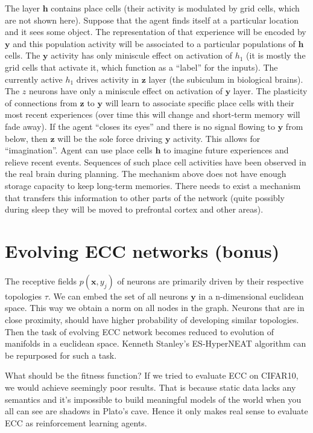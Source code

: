 \documentclass[12pt]{article}
\begin{document}
The layer $\boldsymbol{h}$ contains place cells (their activity is modulated by grid cells, which are not shown here). Suppose that the agent finds itself at a particular location and it sees some object. The representation of that experience will be encoded by $\boldsymbol{y}$ and this population activity will be associated to a particular populations of $\boldsymbol{h}$ cells. The $\boldsymbol{y}$  activity has only miniscule effect on activation of $h_1$ (it is mostly the grid cells that activate it, which function as a ``label'' for the inputs). The currently active $h_1$ drives activity in $\boldsymbol{z}$ layer (the subiculum in biological brains). The $z$ neurons have only a miniscule effect on activation of $\boldsymbol{y}$ layer. The plasticity of connections from $\boldsymbol{z}$ to $\boldsymbol{y}$ will learn to associate specific place cells with their most recent experiences (over time this will change and short-term memory will fade away). If the agent ``closes its eyes'' and there is no signal flowing to $\boldsymbol{y}$ from below, then $\boldsymbol{z}$ will be the sole force driving $\boldsymbol{y}$ activity. This allows for ``imagination''. Agent can use place cells $\boldsymbol{h}$ to imagine future experiences and relieve recent events. Sequences of such place cell activities have been observed in the real brain during planning. The mechanism above does not have enough storage capacity to keep long-term memories. There needs to exist a mechanism that transfers this information to other parts of the network (quite possibly during sleep they will be moved to prefrontal cortex and other areas).


\section{Evolving ECC networks (bonus)}

The receptive fields $p(\boldsymbol{x},y_j)$ of neurons are primarily driven by their respective topologies $\tau$. We can embed the set of all neurons $\boldsymbol{y}$ in a n-dimensional euclidean space. This way we obtain a norm on all nodes in the graph. Neurons that are in close proximity, should have higher probability of developing similar topologies. Then the task of evolving ECC network becomes reduced to evolution of manifolds in a euclidean space. Kenneth Stanley's ES-HyperNEAT algorithm can be repurposed for such a task. 

What should be the fitness function?  If we tried to evaluate ECC on CIFAR10, we would achieve seemingly poor results. That is because static data lacks any semantics and it's impossible to build meaningful models of the world when you all can see are shadows in Plato's cave. Hence it only makes real sense to evaluate ECC as reinforcement  learning agents. 
\end{document}
